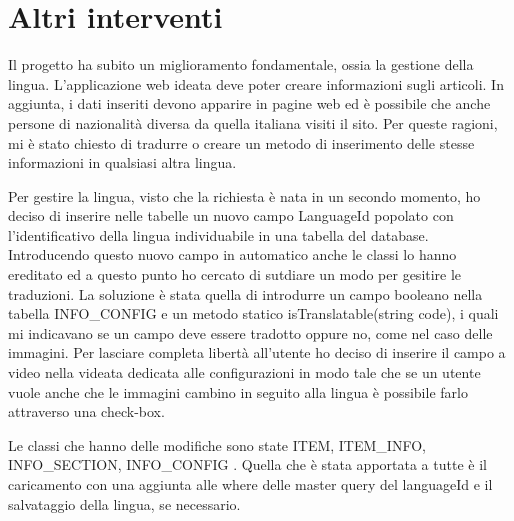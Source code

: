 \section{Altri interventi}\label{altriInterveti}
Il progetto ha subito un miglioramento fondamentale, ossia la gestione della lingua. L'applicazione web ideata deve poter creare informazioni sugli  articoli. In aggiunta, i dati inseriti devono apparire in pagine web ed è possibile che anche persone di nazionalità diversa da quella italiana visiti il sito. Per queste ragioni, mi è stato chiesto di tradurre o creare un metodo di inserimento delle stesse informazioni in qualsiasi altra lingua.

Per gestire la lingua, visto che la richiesta è nata in un secondo momento, ho deciso di inserire nelle tabelle un nuovo campo LanguageId popolato con l'identificativo della lingua individuabile in una tabella del database.
Introducendo questo nuovo campo in automatico anche le classi lo hanno ereditato ed a questo punto ho cercato di sutdiare un modo per gesitire le traduzioni. La soluzione è stata quella di introdurre un campo booleano nella tabella INFO\_CONFIG e un metodo statico isTranslatable(string code), i quali mi indicavano se un campo deve essere tradotto oppure no, come nel caso delle immagini.
Per lasciare completa libertà all'utente ho deciso di inserire il campo a video nella videata dedicata alle configurazioni in modo tale che se un utente vuole anche che le immagini cambino in seguito alla lingua è possibile farlo attraverso una check-box.

Le classi che hanno delle modifiche sono state ITEM, ITEM\_INFO, INFO\_SECTION, INFO\_CONFIG . Quella che è stata apportata a tutte è il caricamento con una aggiunta alle where delle master query del languageId e il salvataggio della lingua, se necessario.

